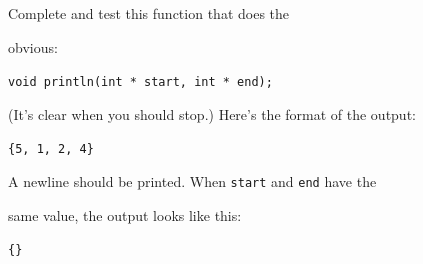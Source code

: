 Complete and test this function that does the

obvious:



\verb!void println(int * start, int * end);!



(It's clear when you should stop.) Here's the format of the output:



\verb!{5, 1, 2, 4}!



A newline should be printed. When \texttt{start} and \texttt{end} have the

same value, the output looks like this:



\verb!{}!

